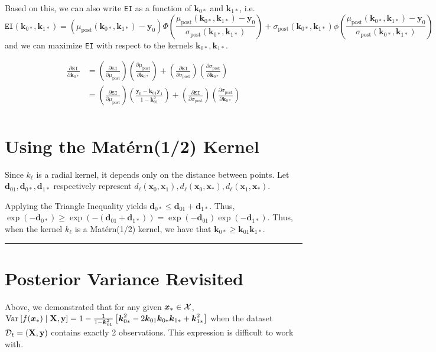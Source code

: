\documentclass[11pt]{article}
\numberwithin{figure}{section}
\numberwithin{equation}{section}
\def\EI{\texttt{EI}}
\newcommand{\bs}[1]{\boldsymbol{#1}}
\def\bsx{\bs{x}}
\def\bsy{\bs{y}}
\def\bsk{\bs{k}}
\def\bsd{\bs{d}}
\def\bell{\bs{\ell}}
\def\xast{\bsx_{*}}
\def\Matern{\textrm{Mat\'{e}rn}}
\begin{document}
Based on this, we can also write \EI{} as a function of $\bsk_{0*}$ and $\bsk_{1*}$, i.e. $$\EI(\bsk_{0*}, \bsk_{1*}) = \left(\mu_{\textrm{post}}(\bsk_{0*}, \bsk_{1*}) - \bsy_{0}\right)\Phi\left(\frac{\mu_{\textrm{post}}(\bsk_{0*}, \bsk_{1*}) - \bsy_{0}}{\sigma_{\textrm{post}}(\bsk_{0*}, \bsk_{1*})}\right) + \sigma_{\textrm{post}}(\bsk_{0*}, \bsk_{1*})\phi\left(\frac{\mu_{\textrm{post}}(\bsk_{0*}, \bsk_{1*}) - \bsy_{0}}{\sigma_{\textrm{post}}(\bsk_{0*}, \bsk_{1*})}\right)$$ and we can maximize \EI{} with respect to the kernels $\bsk_{0*}, \bsk_{1*}$.

\begin{align*}
\frac{\partial \EI}{\partial \bsk_{0*}} &= \left(\frac{\partial \EI}{\partial \mu_{\textrm{post}}}\right)\left(\frac{\partial \mu_{\textrm{post}}}{\partial \bsk_{0*}}\right) + \left(\frac{\partial \EI}{\partial \sigma_{\textrm{post}}}\right)\left(\frac{\partial \sigma_{\textrm{post}}}{\partial \bsk_{0*}}\right) \tag{Multivariate Chain Rule}\\
&= \left(\frac{\partial \EI}{\partial \mu_{\textrm{post}}}\right)\left(\frac{\bsy_{0} - \bsk_{01}\bsy_{1}}{1 - \bsk_{01}^2}\right) + \left(\frac{\partial \EI}{\partial \sigma_{\textrm{post}}}\right)\left(\frac{\partial \sigma_{\textrm{post}}}{\partial \bsk_{0*}}\right)\\
\end{align*}



\newpage 

\section{Using the \Matern(1/2) Kernel}

Since $k_{\bell}$ is a radial kernel, it depends only on the distance between points. Let $\bsd_{01}, \bsd_{0*}, \bsd_{1*}$ respectively represent $d_{\bell}(\bsx_{0}, \bsx_{1}), d_{\bell}(\bsx_{0}, \xast), d_{\bell}(\bsx_{1}, \xast)$. 

Applying the Triangle Inequality yields $\bsd_{0*} \le \bsd_{01} + \bsd_{1*}$. Thus, $\exp(-\bsd_{0*}) \ge \exp\left(-\left(\bsd_{01} + \bsd_{1*}\right)\right) = \exp(-\bsd_{01})\exp(-\bsd_{1*})$. Thus, when the kernel $k_{\bell}$ is a \Matern(1/2) kernel, we have that $\bsk_{0*} \ge \bsk_{01}\bsk_{1*}$.
\noindent\rule{\textwidth}{0.8pt}

\section{Posterior Variance Revisited}
Above, we demonstrated that for any given $\xast \in \calX$, $\var{f(\xast) \mid \mathbf{X}, \mathbf{y}} = 1 - \frac{1}{1 - \bsk_{01}^{2}}\left[\bsk_{0*}^{2} - 2\bsk_{01}\bsk_{0*}\bsk_{1*} + \bsk_{1*}^{2}\right]$ when the dataset $\mathcal{D}_{t} = (\mathbf{X}, \mathbf{y})$ contains exactly 2 observations. This expression is difficult to work with.
\end{document}
